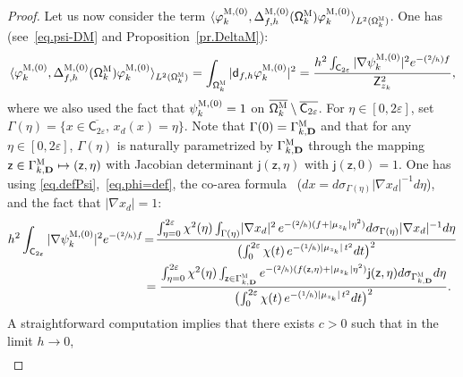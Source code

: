 \documentclass[JEP,XML,SOM,Unicode,NoEqCountersInSection,NoFloatCountersInSection,published]{cedram}
\newcommand{\Psfrac}[2]{(\sfrac{#1}{#2})}
\newcommand\mto{\mathchoice{\longmapsto}{\mapsto}{\mapsto}{\mapsto}}
\newcommand{\mbf}[1]{\mathbf{#1}}
\let\ve\varepsilon
\theoremstyle{plain}
\theoremstyle{definition}
\begin{document}
\begin{proof}
Let us now consider the term $\langle \varphi^{\textsc{M},(0)}_k,\Delta_{f,h}^{\textsc{M}, (0)}(\mathsf \Omega_k^{\textsc{M}}) \varphi^{\textsc{M},(0)}_k \rangle_{L^2(\mathsf \Omega_k^{\textsc{M}})}$. One has (see~\eqref{eq.psi-DM} and Proposition~\ref{pr.DeltaM}):
\begin{align*}
\langle \varphi^{\textsc{M},(0)}_k,\Delta_{f,h}^{\textsc{M}, (0)}(\mathsf \Omega_k^{\textsc{M}}) \varphi^{\textsc{M},(0)}_k \rangle_{L^2(\mathsf \Omega_k^{\textsc{M}})}= \int_{\mathsf \Omega_k^{\textsc{M}}} \vert \mathsf d_{f,h} \varphi^{\textsc{M},(0)}_k \vert^2 = \frac{h^2 \int_{\mathsf C_{2\ve}} \vert \nabla \psi^{\textsc{M},(0)}_k \vert^2 e^{-\Psfrac 2h f} }{\mathsf Z_{z_k}^2},
\end{align*}
where we also used the fact that $\psi^{\textsc{M},(0)}_k=1$ on $
\overline{\mathsf \Omega_k^{\textsc{M}} }\setminus \overline{\mathsf
C_{2\ve}}$. For $\eta\in [0,2\ve]$, set $ \Gamma (\eta)=\{ x
\in\overline{ \mathsf C_{2\ve}},\, x_d(x)=\eta\}$. Note that $ \Gamma
(0)=\Gamma^{\textsc{M}}_{k,\mbf D}$ and that for any $\eta\in
[0,2\ve]$, $\Gamma (\eta)$ is naturally parametrized by
$\Gamma^{\textsc{M}}_{k,\mbf D}$ through the mapping $\mathsf z\in
\Gamma^{\textsc{M}}_{k,\mbf D}\mto (\mathsf z,\eta)$ with Jacobian
determinant $\mathsf j(\mathsf z,\eta)$ with $\mathsf j(\mathsf
z,0)=1$. One has using \eqref{eq.defPsi},~\eqref{eq.phi=def}, the co-area formula~\cite{evans-gariepy-18} ($dx=d\sigma_{\Gamma (\eta)} |\nabla x_d|^{-1} d\eta$), and the fact that
$\vert \nabla x_d\vert=1$:\vspace*{-3pt}
\begin{align*}
{h^2 \int_{\mathsf C_{2\ve}} \vert\nabla \psi^{\textsc{M},(0)}_k \vert^2 e^{-\Psfrac 2h f} } &\!=\! \frac{ \int_{\eta=0}^{2\ve} \chi^2(\eta) \int_{\Gamma (\eta) } \! |\nabla x_d|^2 \, e^{-\Psfrac 2h (f +\vert \mu_{z_k}\vert \eta^2)} d\sigma _{\Gamma (\eta)} |\nabla x_d|^{-1} d\eta }{ \bigl(\int_0^{2\ve}\chi(t)\, e^{-\Psfrac 1h\vert \mu_{z_k}\vert \, t^2} dt\bigr)^2 }\\
&=\frac{ \int_{\eta=0}^{2\ve} \chi^2(\eta) \int_{\mathsf z \in \Gamma_{k,\mbf D}^{\textsc{M}} } e^{-\Psfrac 2h (f(\mathsf z,\eta) +\vert \mu_{z_k}\vert \eta^2)} \mathsf j(\mathsf z,\eta) d\sigma _{\Gamma^{\textsc{M}}_{k,\mbf D}} d\eta }{ \bigl(\int_0^{2\ve}\chi(t)\, e^{-\Psfrac 1h\vert \mu_{z_k}\vert \, t^2} dt\bigr)^2 }.
\end{align*}
A straightforward computation implies that there exists $c>0$ such that in
the limit $h\to 0$,\vspace*{-3pt}
\begin{align}\label{eq.chiUU2}

\end{align}
\end{proof}
\end{document}
